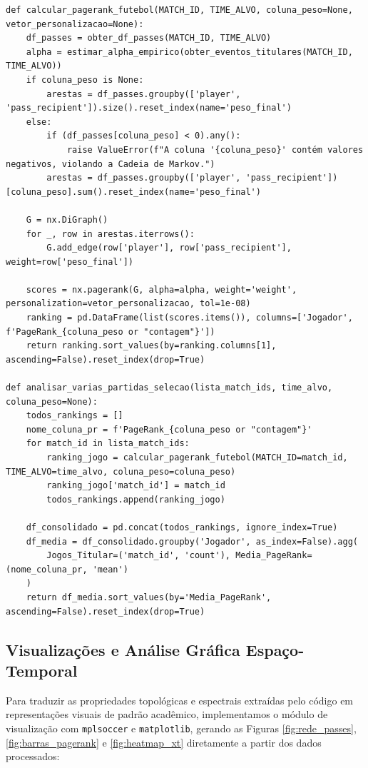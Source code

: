 \documentclass[10pt,a4paper]{article}
\theoremstyle{definition}
\theoremstyle{plain}
\theoremstyle{remark}
\begin{document}
\begin{lstlisting}[caption={Construção do digrafo no NetworkX, execução do PageRank e agregação multi-partida.}]
def calcular_pagerank_futebol(MATCH_ID, TIME_ALVO, coluna_peso=None, vetor_personalizacao=None):
    df_passes = obter_df_passes(MATCH_ID, TIME_ALVO)
    alpha = estimar_alpha_empirico(obter_eventos_titulares(MATCH_ID, TIME_ALVO))
    if coluna_peso is None:
        arestas = df_passes.groupby(['player', 'pass_recipient']).size().reset_index(name='peso_final')
    else:
        if (df_passes[coluna_peso] < 0).any():
            raise ValueError(f"A coluna '{coluna_peso}' contém valores negativos, violando a Cadeia de Markov.")
        arestas = df_passes.groupby(['player', 'pass_recipient'])[coluna_peso].sum().reset_index(name='peso_final')

    G = nx.DiGraph()
    for _, row in arestas.iterrows():
        G.add_edge(row['player'], row['pass_recipient'], weight=row['peso_final'])

    scores = nx.pagerank(G, alpha=alpha, weight='weight', personalization=vetor_personalizacao, tol=1e-08)
    ranking = pd.DataFrame(list(scores.items()), columns=['Jogador', f'PageRank_{coluna_peso or "contagem"}'])
    return ranking.sort_values(by=ranking.columns[1], ascending=False).reset_index(drop=True)

def analisar_varias_partidas_selecao(lista_match_ids, time_alvo, coluna_peso=None):
    todos_rankings = []
    nome_coluna_pr = f'PageRank_{coluna_peso or "contagem"}'
    for match_id in lista_match_ids:
        ranking_jogo = calcular_pagerank_futebol(MATCH_ID=match_id, TIME_ALVO=time_alvo, coluna_peso=coluna_peso)
        ranking_jogo['match_id'] = match_id
        todos_rankings.append(ranking_jogo)

    df_consolidado = pd.concat(todos_rankings, ignore_index=True)
    df_media = df_consolidado.groupby('Jogador', as_index=False).agg(
        Jogos_Titular=('match_id', 'count'), Media_PageRank=(nome_coluna_pr, 'mean')
    )
    return df_media.sort_values(by='Media_PageRank', ascending=False).reset_index(drop=True)
\end{lstlisting}

\subsection{\sffamily Visualizações e Análise Gráfica Espaço-Temporal}

Para traduzir as propriedades topológicas e espectrais extraídas pelo código em representações visuais de padrão acadêmico, implementamos o módulo de visualização com \texttt{mplsoccer} e \texttt{matplotlib}, gerando as Figuras \ref{fig:rede_passes}, \ref{fig:barras_pagerank} e \ref{fig:heatmap_xt} diretamente a partir dos dados processados:
\end{document}
